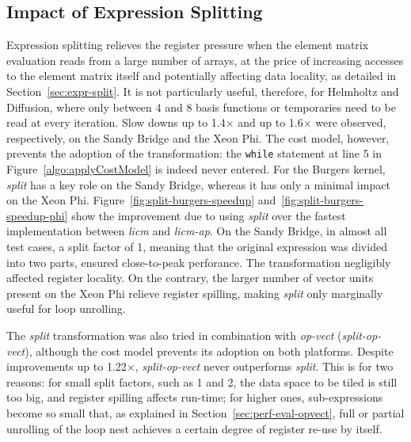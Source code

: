 \documentclass[conference]{IEEEtran}
\begin{document}
\subsection{Impact of Expression Splitting}
\label{sec:perf-results-split}
Expression splitting relieves the register pressure when the element matrix evaluation reads from a large number of arrays, at the price of increasing accesses to the element matrix itself and potentially affecting data locality, as detailed in Section~\ref{sec:expr-split}. It is not particularly useful, therefore, for Helmholtz and Diffusion, where only between 4 and 8 basis functions or temporaries need to be read at every iteration. Slow downs up to 1.4$\times$ and up to 1.6$\times$ were observed, respectively, on the Sandy Bridge and the Xeon Phi. The cost model, however, prevents the adoption of the transformation: the \texttt{while} statement at line 5 in Figure~\ref{algo:applyCostModel} is indeed never entered. For the Burgers kernel, \emph{split} has a key role on the Sandy Bridge, whereas it has only a minimal impact on the Xeon Phi. Figure~\ref{fig:split-burgers-speedup} and~\ref{fig:split-burgers-speedup-phi} show the improvement due to using \emph{split} over the fastest implementation between \emph{licm} and \emph{licm-ap}. On the Sandy Bridge, in almost all test cases, a split factor of 1, meaning that the original expression was divided into two parts, ensured close-to-peak perforance. The transformation negligibly affected register locality. On the contrary, the larger number of vector units present on the Xeon Phi relieve register spilling, making \emph{split} only marginally useful for loop unrolling. 

The \emph{split} transformation was also tried in combination with \emph{op-vect} (\emph{split-op-vect}), although the cost model prevents its adoption on both platforms. Despite improvements up to 1.22$\times$, \emph{split-op-vect} never outperforms \emph{split}. This is for two reasons: for small split factors, such as 1 and 2, the data space to be tiled is still too big, and register spilling affects run-time; for higher ones, sub-expressions become so small that, as explained in Section~\ref{sec:perf-eval-opvect}, full or partial unrolling of the loop nest achieves a certain degree of register re-use by itself.
\end{document}
